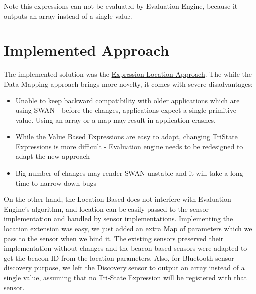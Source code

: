 Note this expressions can not be evaluated by Evaluation Engine, because it outputs an array instead of a single value.


\section{Implemented Approach}
The implemented solution was the \hyperref[sssec:exprlocation]{Expression Location Approach}.
The while the Data Mapping approach brings more novelty, it comes with severe disadvantages:
\begin{itemize}
 \item Unable to keep backward compatibility with older applications which are using SWAN - before the changes, applications
 expect a single primitive value. Using an array or a map may result in application crashes.
 \item While the Value Based Expressions are easy to adapt, changing TriState Expressions is more difficult - Evaluation engine needs to be redesigned to adapt the new approach
 \item Big number of changes may render SWAN unstable and it will take a long time to narrow down bugs
\end{itemize}

On the other hand, the Location Based does not interfere with Evaluation Engine's algorithm, and location can be easily passed to the sensor implementation and 
handled by sensor implementations. Implementing the location extension was easy, we just added an extra Map of parameters which we pass to the sensor
when we bind it.
The existing sensors preserved their implementation without changes and the beacon based sensors were adapted to get the beacon ID from the location parameters.
Also, for Bluetooth sensor discovery purpose, we left the Discovery sensor to output an array instead of a single value, assuming that no Tri-State Expression will be registered with that 
sensor.
